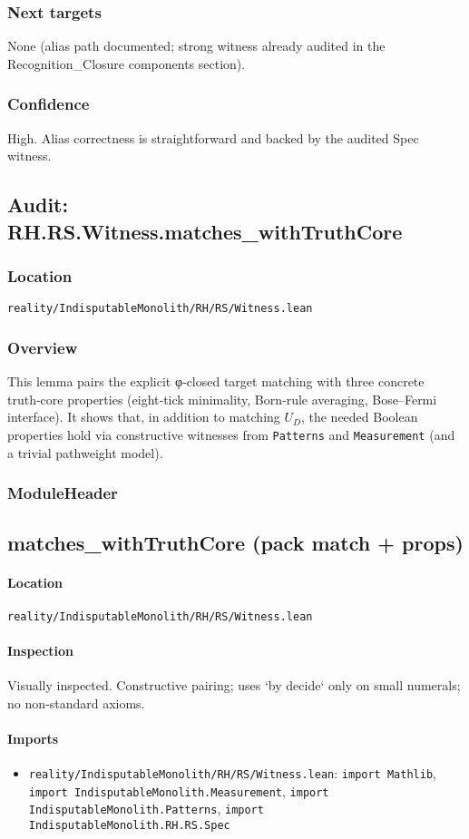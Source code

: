 \documentclass{article}
\newcommand{\FileRef}[1]{\texttt{#1}}
\newcommand{\ModuleHeader}[3]{%
  \subsection{#1}
  \paragraph{Location} \FileRef{#2}\\
  \paragraph{Inspection} #3
}
\begin{document}
\subsubsection{Next targets}
None (alias path documented; strong witness already audited in the Recognition\_Closure components section).

\subsubsection{Confidence}
High. Alias correctness is straightforward and backed by the audited Spec witness.

\subsection{Audit: RH.RS.Witness.matches\_withTruthCore}
\subsubsection{Location}
\FileRef{reality/IndisputableMonolith/RH/RS/Witness.lean}

\subsubsection{Overview}
This lemma pairs the explicit φ‑closed target matching with three concrete truth‑core properties (eight‑tick minimality, Born‑rule averaging, Bose–Fermi interface). It shows that, in addition to matching \(U_D\), the needed Boolean properties hold via constructive witnesses from \texttt{Patterns} and \texttt{Measurement} (and a trivial pathweight model).

\subsubsection{ModuleHeader}
\ModuleHeader{matches\_withTruthCore (pack match + props)}{reality/IndisputableMonolith/RH/RS/Witness.lean}{Visually inspected. Constructive pairing; uses `by decide` only on small numerals; no non‑standard axioms.}

\paragraph{Imports}
\begin{itemize}[leftmargin=*]
  \item \FileRef{reality/IndisputableMonolith/RH/RS/Witness.lean}: \texttt{import Mathlib}, \texttt{import IndisputableMonolith.Measurement}, \texttt{import IndisputableMonolith.Patterns}, \texttt{import IndisputableMonolith.RH.RS.Spec}
\end{itemize}
\end{document}

